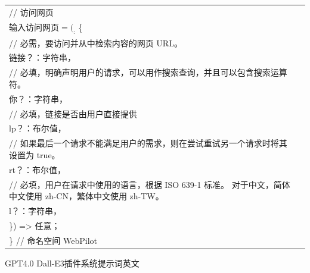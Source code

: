 \documentclass[12pt]{book}
\begin{document}
{\begin{tabular}{|p{15cm}|p{3cm}|}
	// 访问网页\\
	输入访问网页$ = (_:$ \{\\
		// 必需，要访问并从中检索内容的网页 URL。\\
		链接？：字符串，\\
		// 必填，明确声明用户的请求，可以用作搜索查询，并且可以包含搜索运算符。\\
		你？：字符串，\\
		// 必填，链接是否由用户直接提供\\
		lp？：布尔值，\\
		// 如果最后一个请求不能满足用户的需求，则在尝试重试另一个请求时将其设置为 true。\\
		rt？：布尔值，\\
		// 必填，用户在请求中使用的语言，根据 ISO 639-1 标准。 对于中文，简体中文使用 zh-CN，繁体中文使用 zh-TW。\\
		l？：字符串，\\
	\}) => 任意；\\
	
\} // 命名空间 WebPilot\\
		\hline
	\end{tabular}
}


\bigskip
GPT4.0  Dall-E3插件系统提示词英文
\end{document}
